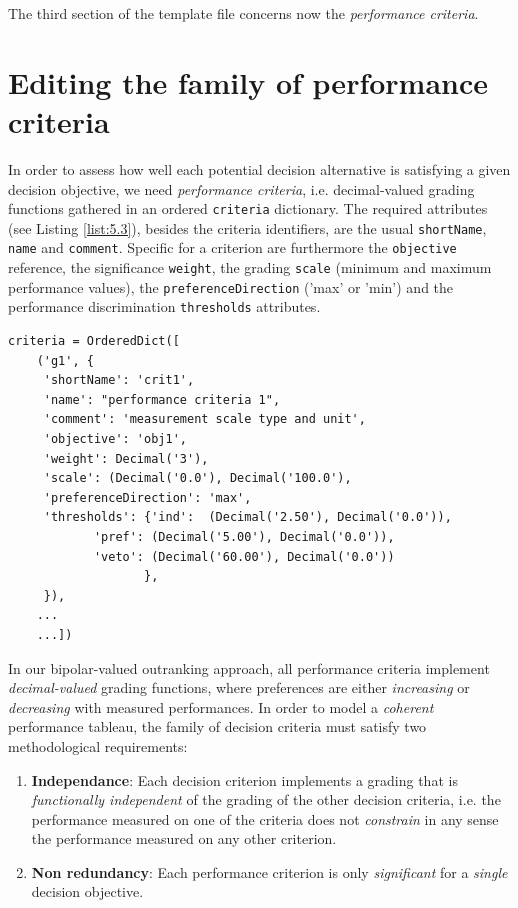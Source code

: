 The third section of the template file concerns now the \emph{performance criteria}.

\section{Editing the family of performance criteria}
\label{sec:5.4}

In order to assess how well each potential decision alternative is satisfying a given decision objective, we need \emph{performance criteria}, i.e. decimal-valued grading functions gathered in an ordered \texttt{criteria} dictionary. The required attributes (see Listing \ref{list:5.3}), besides the criteria identifiers, are the usual \texttt{shortName}, \texttt{name} and \texttt{comment}. Specific for a criterion are furthermore the \texttt{objective} reference, the significance \texttt{weight}, the grading \texttt{scale} (minimum and  maximum performance values), the \texttt{preferenceDirection} ('max' or 'min') and the performance discrimination \texttt{thresholds} attributes.
\begin{lstlisting}[caption={Example of performance criteria description},label=list:5.3]
   criteria = OrderedDict([
    ('g1', {
     'shortName': 'crit1',
     'name': "performance criteria 1",
     'comment': 'measurement scale type and unit',
     'objective': 'obj1',
     'weight': Decimal('3'),
     'scale': (Decimal('0.0'), Decimal('100.0'),
     'preferenceDirection': 'max',
     'thresholds': {'ind':  (Decimal('2.50'), Decimal('0.0')),
		    'pref': (Decimal('5.00'), Decimal('0.0')),
		    'veto': (Decimal('60.00'), Decimal('0.0'))
                   },
     }),
    ...
    ...])
\end{lstlisting}

In our bipolar-valued outranking approach, all performance criteria implement \emph{decimal-valued} grading functions, where preferences are either \emph{increasing} or \emph{decreasing} with measured performances. In order to model a \emph{coherent} performance tableau, the family of decision criteria must satisfy two methodological requirements:
\begin{enumerate}[leftmargin=1cm]
  \item \textbf{Independance}: Each decision criterion implements a grading that is \emph{functionally independent} of the grading of the other decision criteria, i.e. the performance measured on one of the criteria does not \emph{constrain} in any sense the performance measured on any other criterion.
  \item \textbf{Non redundancy}: Each performance criterion is only \emph{significant} for a \emph{single} decision objective.
\end{enumerate}

